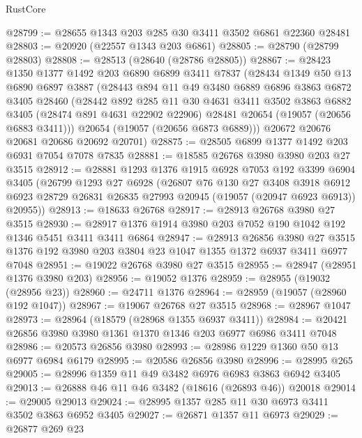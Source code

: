 \begin{lexlean}{RustCore}
\begin{coremodule}
@28799 := @28655 @1343 @203 @285 @30 @3411 @3502 @6861 @22360 @28481
@28803 := @20920 (@22557 @1343 @203 @6861)
@28805 := @28790 (@28799 @28803)
@28808 := @28513 (@28640 (@28786 @28805))
@28867 := @28423
    @1350
    @1377
    @1492
    @203
    @6890
    @6899
    @3411
    @7837
    (@28434
      @1349
      @50
      @13
      @6890
      @6897
      @3887
      (@28443
        @894
        @11
        @49
        @3480
        @6889
        @6896
        @3863
        @6872
        @3405
        @28460
        (@28442
          @892
          @285
          @11
          @30
          @4631
          @3411
          @3502
          @3863
          @6882
          @3405
          (@28474 @891 @4631 @22902 @22906)
          @28481
          @20654
          (@19057 (@20656 @6883 @3411)))
        @20654
        (@19057 (@20656 @6873 @6889)))
      @20672
      @20676
      @20681
      @20686
      @20692
      @20701)
@28875 := @28505 @6899 @1377 @1492 @203 @6931 @7054 @7078 @7835
@28881 := @18585 @26768 @3980 @3980 @203 @27 @3515
@28912 := @28881
    @1293
    @1376
    @1915
    @6928
    @7053
    @192
    @3399
    @6904
    @3405
    (@26799
      @1293
      @27
      @6928
      (@26807
        @76
        @130
        @27
        @3408
        @3918
        @6912
        @6923
        @28729
        @26831
        @26835
        @27993
        @20945
        (@19057 (@20947 @6923 @6913))
        @20955))
@28913 := @18633 @26768
@28917 := @28913 @26768 @3980 @27 @3515
@28930 := @28917 @1376 @1914 @3980 @203 @7052 @190 @1042 @192 @1346 @5451 @3411 @3411 @6864
@28947 := @28913
    @26856
    @3980
    @27
    @3515
    @1376
    @192
    @3980
    @203
    @3804
    @23
    @1047
    @1355
    @1372
    @6937
    @3411
    @6977
    @7048
@28951 := @19022 @26768 @3980 @27 @3515
@28955 := @28947 (@28951 @1376 @3980 @203)
@28956 := @19052 @1376
@28959 := @28955 (@19032 (@28956 @23))
@28960 := @24711 @1376
@28964 := @28959 (@19057 (@28960 @192 @1047))
@28967 := @19067 @26768 @27 @3515
@28968 := @28967 @1047
@28973 := @28964 (@18579 (@28968 @1355 @6937 @3411))
@28984 := @20421 @26856 @3980 @3980 @1361 @1370 @1346 @203 @6977 @6986 @3411 @7048
@28986 := @20573 @26856 @3980
@28993 := @28986 @1229 @1360 @50 @13 @6977 @6984 @6179
@28995 := @20586 @26856 @3980
@28996 := @28995 @265
@29005 := @28996 @1359 @11 @49 @3482 @6976 @6983 @3863 @6942 @3405
@29013 := @26888 @46 @11 @46 @3482 (@18616 (@26893 @46)) @20018
@29014 := @29005 @29013
@29024 := @28995 @1357 @285 @11 @30 @6973 @3411 @3502 @3863 @6952 @3405
@29027 := @26871 @1357 @11 @6973
@29029 := @26877 @269 @23

\end{coremodule}
\end{lexlean}
